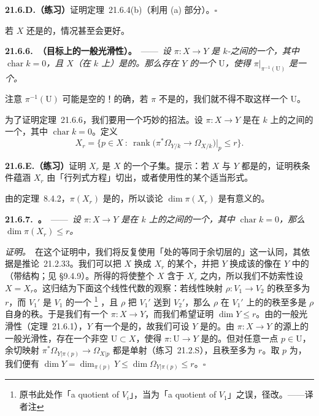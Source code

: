 \textbf{21.6.D.（练习）}\quad 证明\mbox{定理~21.6.4(b)}（利用 (a) 部分）。\hfill$\square$

若 $X$ 还是\trSmooth{}的，情况甚至会更好。

\textbf{21.6.6.\ \trhTheorem（目标上的一般光滑性）。}\ ——\ \emph{设 $\pi\colon X\to Y$ 是 $k$-\trVariety{}之间的一个\trMorphism，其中 $\operatorname{char}k=0$，且 $X$（在 $k$ 上）是\trSmooth{}的。那么存在 $Y$ 的一个\trDense\trOpenSubset{} $\mathrm{U}$，使得 $\pi|_{\pi^{-1}(\mathrm{U})}$ 是一个\trSmooth\trMorphism。}

注意 $\pi^{-1}(\mathrm{U})$ 可能是空的！的确，若 $\pi$ 不是\trDominant{}的，我们就不得不取这样一个 $\mathrm{U}$。

为了证明\mbox{定理~21.6.6}，我们要用一个巧妙的招法。设 $\pi\colon X\to Y$ 是在 $k$ 上\trFiniteType{}的\trScheme{}之间的一个\trMorphism，其中 $\operatorname{char}k=0$。定义
\[
X_r=\bigl\{p\in X\ :\ \operatorname{rank}\bigl(\pi^*\Omega_{Y/k}\to\Omega_{X/k}\bigr)\bigr|_p\le r\bigr\}.
\]

\textbf{21.6.E.（练习）}\quad 证明 $X_r$ 是 $X$ 的一个\trConstructible{}子集。提示：若 $X$ 与 $Y$ 都是\trSmooth{}的，证明秩条件蕴涵 $X_r$ 由「行列式方程」切出，或者使用\trUpperSemicontinuous{}性的某个适当形式。

由\trChevalley{}的\mbox{定理~8.4.2}，$\pi(X_r)$ 是\trConstructible{}的，所以谈论 $\dim\pi(X_r)$ 是有意义的。

\textbf{21.6.7.\ \trhLemma。}\ ——\ \emph{设 $\pi\colon X\to Y$ 是在 $k$ 上\trFiniteType{}的\trScheme{}之间的一个\trMorphism，其中 $\operatorname{char}k=0$，那么 $\dim\pi(X_r)\le r$。}

\emph{证明。}\ 在这个证明中，我们将反复使用「\trClosedPoint{}处的\trZariski{}\trCotangentSpace{}等同于余切层的\trFiber」这一认同，其依据是\mbox{推论~21.2.33}。我们可以把 $X$ 换成 $X_r$ 的某个\trIrreducibleComponent，并把 $Y$ 换成该\trIrreducibleComponent{}的像在 $Y$ 中的\trClosure（带\trReduced\trSubscheme{}结构；见 \S9.4.9）。所得的\trMorphism{}将使整个 $X$ 含于 $X_r$ 之内，所以我们不妨索性设 $X=X_r$。这归结为下面这个线性代数的观察：若线性映射 $\rho\colon V_1\to V_2$ 的秩至多为 $r$，而 $V_1'$ 是 $V_1$ 的一个\trQuotient%
\footnote{原书此处作「a quotient of $V_i$」，当为「a quotient of $V_1$」之误，径改。——译者注}
，且 $\rho$ 把 $V_1'$ 送到 $V_2'$，那么 $\rho$ 在 $V_1'$ 上的\trRestriction{}的秩至多是 $\rho$ 自身的秩。于是我们有一个\trDominant\trMorphism{} $\pi\colon X\to Y$，而我们希望证明 $\dim Y\le r$。由\trVariety{}的一般光滑性（\mbox{定理~21.6.1}），$Y$ 有一个\trDense\trOpenSet{}是\trSmooth{}的，故我们可设 $Y$ 是\trSmooth{}的。由 $\pi\colon X\to Y$ 的源上的一般光滑性，存在一个非空\trOpenSubset{} $\mathrm{U}\subset X$，使得 $\pi\colon\mathrm{U}\to Y$ 是\trSmooth{}的。但对任意一点 $p\in\mathrm{U}$，余切映射 $\pi^*\Omega_{Y|\pi(p)}\to\Omega_{X|p}$ 都是单射（\mbox{练习~21.2.S}），且秩至多为 $r$。取 $p$ 为\trClosedPoint，我们便有 $\dim Y=\dim_{\pi(p)}Y\le\dim\Omega_{Y|\pi(p)}\le r$。\hfill$\square$

